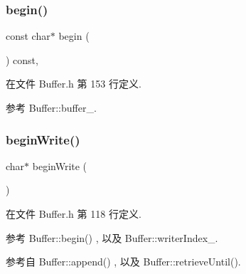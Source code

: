 \subsubsection{\texorpdfstring{begin()}{begin()}\hspace{0.1cm}{\footnotesize\ttfamily [2/2]}}
{\footnotesize\ttfamily const char$\ast$ begin (\begin{DoxyParamCaption}{ }\end{DoxyParamCaption}) const\hspace{0.3cm}{\ttfamily [inline]}, {\ttfamily [private]}}



在文件 Buffer.\+h 第 153 行定义.



参考 Buffer\+::buffer\+\_\+.

\mbox{\label{classmuduo_1_1Buffer_a71778facb9cd13bc2403edf59621f3f5}} 
\subsubsection{\texorpdfstring{begin\+Write()}{beginWrite()}\hspace{0.1cm}{\footnotesize\ttfamily [1/2]}}
{\footnotesize\ttfamily char$\ast$ begin\+Write (\begin{DoxyParamCaption}{ }\end{DoxyParamCaption})\hspace{0.3cm}{\ttfamily [inline]}}



在文件 Buffer.\+h 第 118 行定义.



参考 Buffer\+::begin() , 以及 Buffer\+::writer\+Index\+\_\+.



参考自 Buffer\+::append() , 以及 Buffer\+::retrieve\+Until().

